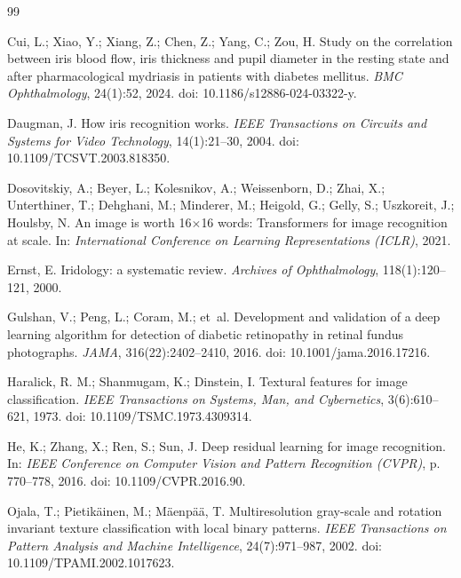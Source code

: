\documentclass[12pt,a4paper]{article}
\begin{document}
\newpage
\begin{thebibliography}{99}

Cui, L.; Xiao, Y.; Xiang, Z.; Chen, Z.; Yang, C.; Zou, H.
\newblock Study on the correlation between iris blood flow, iris thickness and pupil diameter in the
resting state and after pharmacological mydriasis in patients with diabetes mellitus.
\newblock \emph{BMC Ophthalmology}, 24(1):52, 2024.
\newblock doi: 10.1186/s12886-024-03322-y.

Daugman, J.
\newblock How iris recognition works.
\newblock \emph{IEEE Transactions on Circuits and Systems for Video Technology}, 14(1):21--30, 2004.
\newblock doi: 10.1109/TCSVT.2003.818350.

Dosovitskiy, A.; Beyer, L.; Kolesnikov, A.; Weissenborn, D.; Zhai, X.; Unterthiner, T.; Dehghani, M.;
Minderer, M.; Heigold, G.; Gelly, S.; Uszkoreit, J.; Houlsby, N.
\newblock An image is worth 16$\times$16 words: Transformers for image recognition at scale.
\newblock In: \emph{International Conference on Learning Representations (ICLR)}, 2021.

Ernst, E.
\newblock Iridology: a systematic review.
\newblock \emph{Archives of Ophthalmology}, 118(1):120--121, 2000.

Gulshan, V.; Peng, L.; Coram, M.; et~al.
\newblock Development and validation of a deep learning algorithm for detection of diabetic
retinopathy in retinal fundus photographs.
\newblock \emph{JAMA}, 316(22):2402--2410, 2016.
\newblock doi: 10.1001/jama.2016.17216.

Haralick, R. M.; Shanmugam, K.; Dinstein, I.
\newblock Textural features for image classification.
\newblock \emph{IEEE Transactions on Systems, Man, and Cybernetics}, 3(6):610--621, 1973.
\newblock doi: 10.1109/TSMC.1973.4309314.

He, K.; Zhang, X.; Ren, S.; Sun, J.
\newblock Deep residual learning for image recognition.
\newblock In: \emph{IEEE Conference on Computer Vision and Pattern Recognition (CVPR)}, p.
770--778, 2016.
\newblock doi: 10.1109/CVPR.2016.90.

Ojala, T.; Pietik\"ainen, M.; M\"aenp\"a\"a, T.
\newblock Multiresolution gray-scale and rotation invariant texture classification with local binary
patterns.
\newblock \emph{IEEE Transactions on Pattern Analysis and Machine Intelligence}, 24(7):971--987, 2002.
\newblock doi: 10.1109/TPAMI.2002.1017623.


\end{thebibliography}
\end{document}
